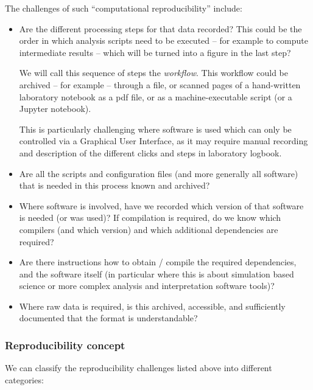 The challenges of such ``computational reproducibility'' include:
\begin{itemize}
\item Are the different processing steps for that data recorded? This could be
the order in which analysis scripts need to be executed -- for example to
compute intermediate results -- which will be turned into a figure in the last
step?

We will call this sequence of steps the \emph{workflow}. This workflow could be
archived -- for example -- through a  file, or scanned
pages of a hand-written laboratory notebook as a pdf file, or as a
machine-executable script (or a Jupyter notebook).

This is particularly challenging where software is used which can only be
controlled via a Graphical User Interface, as it may require manual recording
and description of the different clicks and steps in laboratory logbook.

\item Are all the scripts and configuration files (and more generally all
software) that is needed in this process known and archived? 

\item Where software is involved, have we recorded which version of that
software is needed (or was used)? If compilation is required, do we know which
compilers (and which version) and which additional dependencies are required?

\item Are there instructions how to obtain / compile the required dependencies,
and the software itself (in particular where this is about simulation based
science or more complex analysis and interpretation software tools)?

\item Where raw data is required, is this archived, accessible, and sufficiently
documented that the format is understandable?
\end{itemize}


\subsubsection{Reproducibility concept}

We can classify the reproducibility challenges listed above into different categories:

